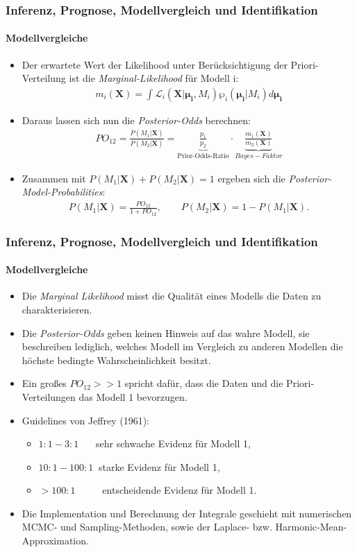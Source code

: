 \documentclass{beamer} %
\begin{document}
\begin{frame}\frametitle{Inferenz, Prognose, Modellvergleich und Identifikation}\framesubtitle{Modellvergleiche}
  \begin{itemize}
      \item Der erwartete Wert der Likelihood unter Berücksichtigung der Priori-Verteilung ist die \emph{Marginal-Likelihood} für Modell i:
    \begin{align*}
      m_i(\mathbf{X}) = \int \mathcal{L}_i(\mathbf{X}|\boldsymbol{\mu_i},M_i)\wp_i(\boldsymbol{\mu_i}|M_i)d\boldsymbol{\mu_i}
    \end{align*}
    \item Daraus lassen sich nun die \emph{Posterior-Odds} berechnen:
    \begin{align*}
      PO_{12} = \frac{P(M_1|\mathbf{X})}{P(M_2|\mathbf{X})} = \underbrace{\frac{p_1}{p_2}}_{\text{Prior-Odds-Ratio}}\cdot \underbrace{\frac{m_1(\mathbf{X})}{m_2(\mathbf{X})}}_{Bayes-Faktor}
    \end{align*}
    \item Zusammen mit $P(M_1|\mathbf{X}) + P(M_2|\mathbf{X}) =1$ ergeben sich die \emph{Posterior-Model-Probabilities}:
    \begin{align*}
      P(M_1|\mathbf{X}) = \frac{PO_{12}}{1+PO_{12}}, \qquad P(M_2|\mathbf{X}) = 1-P(M_1|\mathbf{X}).
    \end{align*}
  \end{itemize}
\end{frame}

\begin{frame}\frametitle{Inferenz, Prognose, Modellvergleich und Identifikation}\framesubtitle{Modellvergleiche}
  \begin{itemize}
    \item Die \emph{Marginal Likelihood} misst die Qualität eines Modells die Daten zu charakterisieren.
    \item Die \emph{Posterior-Odds} geben keinen Hinweis auf das wahre Modell, sie beschreiben lediglich, welches Modell im Vergleich zu anderen Modellen die höchste bedingte Wahrscheinlichkeit besitzt.
    \item Ein großes $PO_{12}>>1$ spricht dafür, dass die Daten und die Priori-Verteilungen das Modell 1 bevorzugen.
    \item Guidelines von Jeffrey (1961):
    \begin{itemize}
      \item $1:1 - 3:1\quad~~$ sehr schwache Evidenz für Modell 1,
      \item $10:1 - 100:1~$ starke Evidenz für Modell 1,
      \item $> 100:1\qquad~~$ entscheidende Evidenz für Modell 1.
    \end{itemize}
    \item Die Implementation und Berechnung der Integrale geschieht mit numerischen MCMC- und Sampling-Methoden, sowie der Laplace- bzw. Harmonic-Mean-Approximation.
  \end{itemize}
\end{frame}
\end{document}
